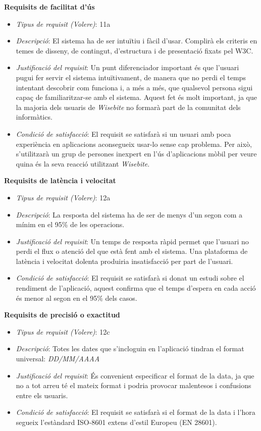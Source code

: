 \noindent\textbf{Requisits de facilitat d'ús}
\begin{itemize}
\item \textit{Tipus de requisit (Volere)}: 11a
\item \textit{Descripció}: El sistema ha de ser intuïtiu i fàcil d'usar. Complirà els criteris en temes de disseny, de contingut, d'estructura i de presentació fixats pel W3C\cite{w3c}.
\item \textit{Justificació del requisit}: Un punt diferenciador important és que l'usuari pugui fer servir el sistema intuïtivament, de manera que no perdi el temps intentant descobrir com funciona i, a més a més, que qualsevol persona sigui capaç de familiaritzar-se amb el sistema. Aquest fet és molt important, ja que la majoria dels usuaris de \textit{Wisebite} no formarà part de la comunitat dels informàtics.
\item \textit{Condició de satisfacció}: El requisit se satisfarà si un usuari amb poca experiència en aplicacions aconsegueix usar-lo sense cap problema. Per això, s'utilitzarà un grup de persones inexpert en l'ús d'aplicacions mòbil per veure quina és la seva reacció utilitzant \textit{Wisebite}.
\end{itemize}

\noindent\textbf{Requisits de latència i velocitat}
\begin{itemize}
\item \textit{Tipus de requisit (Volere)}: 12a
\item \textit{Descripció}: La resposta del sistema ha de ser de menys d'un segon com a mínim en el 95\% de les operacions.
\item \textit{Justificació del requisit}: Un temps de resposta ràpid permet que l'usuari no perdi el flux o atenció del que està fent amb el sistema. Una plataforma de latència i velocitat dolenta produiria insatisfacció per part de l'usuari.
\item \textit{Condició de satisfacció}: El requisit se satisfarà si donat un estudi sobre el rendiment de l'aplicació, aquest confirma que el temps d'espera en cada acció és menor al segon en el 95\% dels casos.
\end{itemize}

\noindent\textbf{Requisits de precisió o exactitud}
\begin{itemize}
\item \textit{Tipus de requisit (Volere)}: 12c
\item \textit{Descripció}: Totes les dates que s'incloguin en l'aplicació tindran el format universal: \textit{DD/MM/AAAA}
\item \textit{Justificació del requisit}: És convenient especificar el format de la data, ja que no a tot arreu té el mateix format i podria provocar malentesos i confusions entre els usuaris.
\item \textit{Condició de satisfacció}: El requisit se satisfarà si el format de la data i l'hora segueix l'estàndard ISO-8601\cite{iso8601} extens d'estil Europeu (EN 28601).
\end{itemize}

